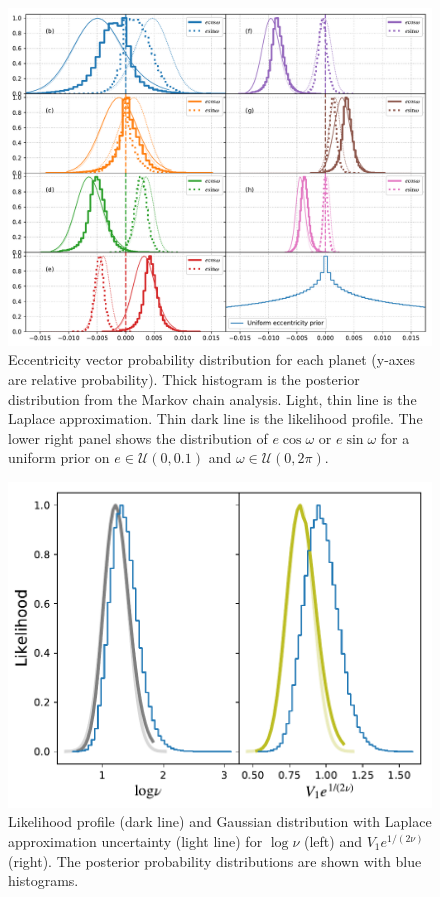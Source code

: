 \documentclass[fleqn,usenatbib]{mnras} %
\begin{document}
\begin{figure}
    \centering
    \includegraphics[width=\hsize]{figures/T1_eccentricity_vectors_likelihood_profile_hmc.pdf}
    \caption{Eccentricity vector probability distribution for each planet (y-axes are relative probability).  Thick histogram is the posterior distribution from the Markov chain analysis.  Light, thin line is the Laplace approximation.  Thin dark line is the likelihood profile.  The lower right panel shows the distribution of
    $e\cos{\omega}$ or $e\sin{\omega}$ for a uniform prior on
    $e \in \mathcal{U}(0,0.1)$ and $\omega \in \mathcal{U}(0,2\pi)$.}
    \label{fig:ecc_likelihood_profile}
\end{figure}


\begin{figure}
    \centering
    \includegraphics[width=\columnwidth]{figures/T1_students_params_transformed.pdf}
    \caption{Likelihood profile (dark line) and Gaussian distribution
    with Laplace approximation uncertainty (light line) for $\log{\nu}$ (left) and
    $V_1 e^{1/(2\nu)}$ (right).  The posterior probability distributions are shown with blue histograms.}
    \label{fig:student_param_likelihood_profile}
\end{figure}
\end{document}

